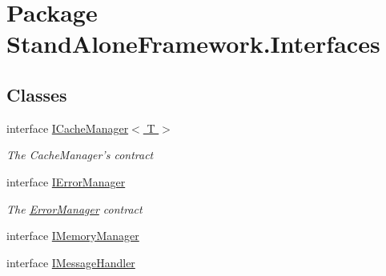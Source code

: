 \hypertarget{namespace_stand_alone_framework_1_1_interfaces}{\section{Package Stand\+Alone\+Framework.\+Interfaces}
\label{namespace_stand_alone_framework_1_1_interfaces}
}
\subsection*{Classes}
\begin{DoxyCompactItemize}
\item 
interface \hyperlink{interface_stand_alone_framework_1_1_interfaces_1_1_i_cache_manager_3_01_t_01_4}{I\+Cache\+Manager$<$ T $>$}
\begin{DoxyCompactList}\small\item\em The Cache\+Manager's contract \end{DoxyCompactList}\item 
interface \hyperlink{interface_stand_alone_framework_1_1_interfaces_1_1_i_error_manager}{I\+Error\+Manager}
\begin{DoxyCompactList}\small\item\em The \hyperlink{class_stand_alone_framework_1_1_error_manager}{Error\+Manager} contract \end{DoxyCompactList}\item 
interface \hyperlink{interface_stand_alone_framework_1_1_interfaces_1_1_i_memory_manager}{I\+Memory\+Manager}
\item 
interface \hyperlink{interface_stand_alone_framework_1_1_interfaces_1_1_i_message_handler}{I\+Message\+Handler}
\end{DoxyCompactItemize}
